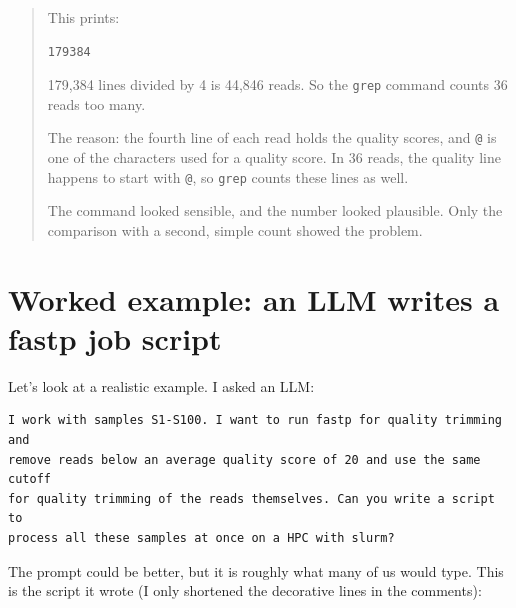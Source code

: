 \documentclass[
  letterpaper,
  DIV=11,
  numbers=noendperiod]{scrreprt}
\begin{document}
\begin{tcolorbox}
\begin{quote}
This prints:

\begin{verbatim}
179384
\end{verbatim}

179,384 lines divided by 4 is 44,846 reads. So the \texttt{grep} command
counts 36 reads too many.

The reason: the fourth line of each read holds the quality scores, and
\texttt{@} is one of the characters used for a quality score. In 36
reads, the quality line happens to start with \texttt{@}, so
\texttt{grep} counts these lines as well.

The command looked sensible, and the number looked plausible. Only the
comparison with a second, simple count showed the problem.
\end{quote}

\end{tcolorbox}

\section{Worked example: an LLM writes a fastp job
script}\label{worked-example-an-llm-writes-a-fastp-job-script}

Let's look at a realistic example. I asked an LLM:

\begin{verbatim}
I work with samples S1-S100. I want to run fastp for quality trimming and
remove reads below an average quality score of 20 and use the same cutoff
for quality trimming of the reads themselves. Can you write a script to
process all these samples at once on a HPC with slurm?
\end{verbatim}

The prompt could be better, but it is roughly what many of us would
type. This is the script it wrote (I only shortened the decorative lines
in the comments):
\end{document}
